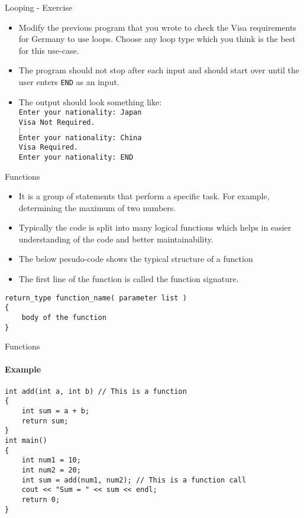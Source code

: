 \documentclass[aspectratio=169]{beamer}
\begin{document}
\begin{frame}[fragile]{Looping - Exercise}
	\begin{itemize}
		\item Modify the previous program that you wrote to check the Visa requirements for Germany to use loops. Choose any loop type which you think is the best for this use-case.
		\item The program should not stop after each input and should start over until the user enters \verb|END| as an input.
		\item The output should look something like: \\ \verb|Enter your nationality: Japan| \\ \verb|Visa Not Required.| \\ $\vdots$\\ \verb|Enter your nationality: China| \\ \verb|Visa Required.| \\ \verb|Enter your nationality: END|
	\end{itemize}
\end{frame}

\begin{frame}[fragile]{Functions}
	\begin{itemize}
		\item It is a group of statements that perform a specific task. For example, determining the maximum of two numbers.
		\item Typically the code is split into many logical functions which helps in easier understanding of the code and better maintainability.
		\item The below pesudo-code shows the typical structure of a function
		\item The first line of the function is called the function signature.
	\end{itemize}
	\begin{lstlisting}
return_type function_name( parameter list )
{
   	body of the function
}
	\end{lstlisting}
\end{frame}

\begin{frame}[fragile]{Functions}
	\framesubtitle{Example}
	\begin{lstlisting}
int add(int a, int b) // This is a function
{
    int sum = a + b;
    return sum;
}
int main()
{
    int num1 = 10;
    int num2 = 20;
    int sum = add(num1, num2); // This is a function call
    cout << "Sum = " << sum << endl;
    return 0;
}
	\end{lstlisting}
\end{frame}
\end{document}
